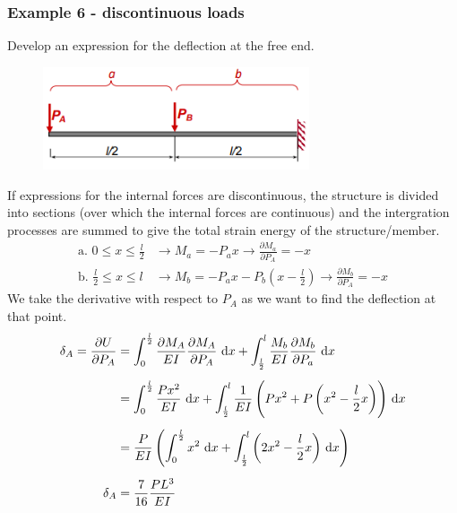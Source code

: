 \documentclass[class=report, crop=false, 12pt,a4paper]{standalone}
\begin{document}
\subsubsection{Example 6 - discontinuous loads}
Develop an expression for the deflection at the free end.
\begin{figure}[H]
  \centering
  \includegraphics[width = 0.7\textwidth]{../img/diagram21.png}
  \caption{}
\end{figure}
If expressions for the internal forces are discontinuous, the structure is divided into sections (over which the internal forces are continuous) and the intergration processes are summed to give the total strain energy of the structure/member.
\begin{align}
  \textrm{a. } 0 \leq x \leq \frac{l}{2} &\rightarrow M_a = -P_a x \rightarrow \frac{\partial M_a}{\partial P_A} = -x\\
  \textrm{b. } \frac{l}{2} \leq x \leq l &\rightarrow M_b = -P_a x - P_b \left(x-\frac{l}{2}\right) \rightarrow \frac{\partial M_b}{\partial P_A} = -x
\end{align}
We take the derivative with respect to $P_A$ as we want to find the deflection at that point.
\begin{align}
  \delta_A = \frac{\partial U}{\partial P_A} &= \int_0^{\frac{l}{2}} \frac{\partial M_A}{EI} \frac{\partial M_A}{\partial P_A} \, \dif x + \int_{\frac{l}{2}}^l \frac{M_b}{EI} \frac{\partial M_b}{\partial P_a} \, \dif x\\[5pt]
  &= \int_0^{\frac{l}{2}} \frac{Px^2}{EI}\, \dif x + \int_{\frac{l}{2}}^l \frac{1}{EI}\left(Px^2 + P\left(x^2-\frac{l}{2}x\right)\right)\, \dif x\\[5pt]
  &= \frac{P}{EI}\left(\int_0^{\frac{l}{2}}x^2\,\dif x +\int_{\frac{l}{2}}^l \left(2x^2-\frac{l}{2}x\right)\, \dif x \right) \\[5pt]
  \delta_A &= \frac{7}{16} \frac{PL^3}{EI}
\end{align}
\end{document}
